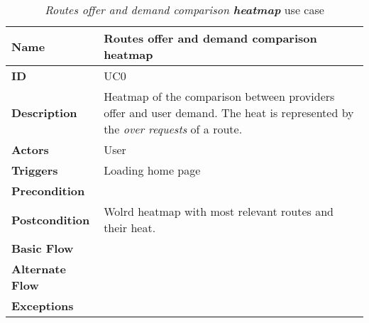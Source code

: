 \begin{table}
\begin{tabular}{|>{\raggedright\arraybackslash}p{3.2cm}|>{\raggedright\arraybackslash}p{10cm}|}
\hline
\textbf{Name}                   & Routes offer and demand comparison \textbf{heatmap} \\
\hline
\textbf{ID}                     & UC0 \\
\hline
\textbf{Description}            & Heatmap of the comparison between providers offer and user demand. The heat is represented by the \textit{over requests} of a route. \\
\hline
\textbf{Actors}                 & User \\
\hline
\textbf{Triggers}               & Loading home page \\
\hline
\textbf{Precondition}           & \\
\hline
\textbf{Postcondition}          & Wolrd heatmap with most relevant routes and their heat. \\
\hline
\textbf{Basic Flow}             & \\
\hline
\textbf{Alternate Flow}         & \\
\hline
\textbf{Exceptions}             & \\
\hline
\end{tabular}
\caption{\textit{Routes offer and demand comparison \textbf{heatmap}} use case}
\label{UC0}
\end{table}

